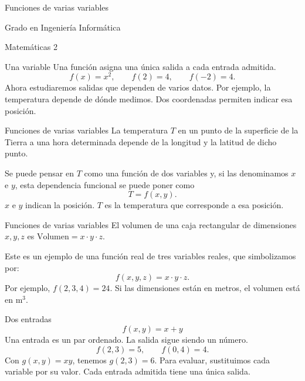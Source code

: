 

\begin{frame}{}
\centering\LARGE Funciones de varias variables\par\vspace{1cm}\large Grado en Ingeniería Informática\par Matemáticas 2
\end{frame}
\begin{frame}{Una variable}
Una función asigna una única salida a cada entrada admitida.
\[f(x)=x^2,\qquad f(2)=4,\qquad f(-2)=4.\]
Ahora estudiaremos salidas que dependen de varios datos.
\medskip
Por ejemplo, la temperatura depende de dónde medimos. Dos coordenadas permiten indicar esa posición.
\end{frame}
\begin{frame}{Funciones de varias variables}
La temperatura $T$ en un punto de la superficie de la Tierra a una hora determinada depende de la longitud y la latitud de dicho punto.
\medskip

Se puede pensar en $T$ como una función de dos variables y, si las denominamos $x$ e $y$, esta dependencia funcional se puede poner como
\[T=f(x,y).\]
$x$ e $y$ indican la posición. $T$ es la temperatura que corresponde a esa posición.
\end{frame}
\begin{frame}{Funciones de varias variables}
El volumen de una caja rectangular de dimensiones $x,y,z$ es $\text{Volumen}=x\cdot y\cdot z$.
\medskip

Este es un ejemplo de una función real de tres variables reales, que simbolizamos por:
\[f(x,y,z)=x\cdot y\cdot z.\]
Por ejemplo, $f(2,3,4)=24$. Si las dimensiones están en metros, el volumen está en $\mathrm m^3$.
\end{frame}
\begin{frame}{Dos entradas}
\[f(x,y)=x+y\]
Una entrada es un par ordenado. La salida sigue siendo un número.
\[f(2,3)=5,\qquad f(0,4)=4.\]
Con $g(x,y)=xy$, tenemos $g(2,3)=6$.
\medskip
Para evaluar, sustituimos cada variable por su valor. Cada entrada admitida tiene una única salida.
\end{frame}
